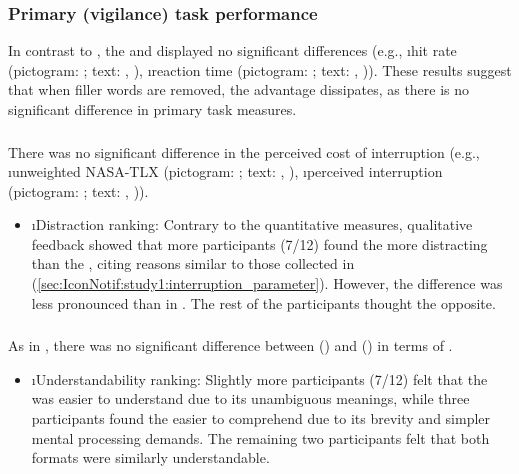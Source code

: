 \subsubsection*{Primary (vigilance) task performance}
\label{sec:IconNotif:study2:primary_task_performance}

In contrast to \studyone{}, the \iconformat{} and \textformat{} displayed no significant differences (e.g., \i{hit rate} (pictogram: ; text: , ), \i{reaction time} (pictogram: ; text: , )). These results suggest that when filler words are removed, the \iconformat{} advantage dissipates, as there is no significant difference in primary task measures.

\subsubsection*{\Interruption{}}
\label{sec:IconNotif:study2:interruption_parameter}

There was no significant difference in the perceived cost of interruption (e.g., \i{unweighted NASA-TLX} (pictogram: ; text: , ), \i{perceived interruption} (pictogram: ; text: , )). 

\begin{itemize}
    \item \i{Distraction ranking}: Contrary to the quantitative measures, qualitative feedback showed that more participants (7/12) found the \textformat{} more distracting than the \iconformat{}, citing reasons similar to those collected in \studyone{} (\autoref{sec:IconNotif:study1:interruption_parameter}). However, the difference was less pronounced than in \studyone{}. The rest of the participants thought the opposite. 
\end{itemize}

\subsubsection*{\Comprehension{}}
\label{sec:IconNotif:study2:comprehension_parameter}

As in \studyone{}, there was no significant difference between \iconnotif{} () and \textnotif{} () in terms of \immediateRecall{}.

\begin{itemize}
    \item \i{Understandability ranking}: Slightly more participants (7/12) felt that the \textformat{} was easier to understand due to its unambiguous meanings, while three participants found the \iconformat{} easier to comprehend due to its brevity and simpler mental processing demands. The remaining two participants felt that both formats were similarly understandable.
\end{itemize}



